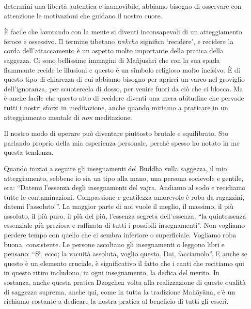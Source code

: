 
 determini una libertà autentica e inamovibile, abbiamo bisogno di osservare con attenzione le motivazioni che guidano il nostro cuore.

È facile che lavorando con la mente si diventi inconsapevoli di un atteggiamento feroce e ossessivo. Il termine tibetano \textit{trekcho} significa `recidere', e recidere la corda dell'attaccamento è un aspetto molto importante della pratica della saggezza. Ci sono bellissime immagini di Mañjushrī che con la sua spada fiammante recide le illusioni e questo è un simbolo religioso molto incisivo. È di questo tipo di chiarezza di cui abbiamo bisogno per aprirci un varco nel groviglio dell'ignoranza, per scuotercela di dosso, per venire fuori da ciò che ci blocca. Ma è anche facile che questo atto di recidere diventi una mera abitudine che pervade tutti i nostri sforzi in meditazione, anche quando miriamo a praticare in un atteggiamento mentale di \textit{non} meditazione. 

Il nostro modo di operare può diventare piuttosto brutale e squilibrato. Sto parlando proprio della mia esperienza personale, perché spesso ho notato in me questa tendenza.

Quando iniziai a seguire gli insegnamenti del Buddha sulla saggezza, il mio atteggiamento, sebbene io sia un tipo alla mano, una persona socievole e gentile, era: ``Datemi l'essenza degli insegnamenti del vajra. Andiamo al sodo e recidiamo tutte le contaminazioni. Compassione e gentilezza amorevole è roba da ragazzini, datemi l'assoluto!''. La maggior parte di noi vuole il meglio, il massimo, il più assoluto, il più puro, il più del più, l'essenza segreta dell'essenza, ``la quintessenza essenziale più preziosa e raffinata di tutti i possibili insegnamenti''. Non vogliamo perdere tempo con quello che ci sembra inferiore o superficiale. Vogliamo roba buona, consistente. Le persone ascoltano gli insegnamenti o leggono libri e pensano: ``Sì, ecco; la vacuità assoluta, voglio questo. Dai, facciamolo''. E anche se questo è un elemento cruciale, è significativo il fatto che i canti che recitiamo qui in questo ritiro includono, in ogni insegnamento, la dedica del merito. In sostanza, anche questa pratica Dzogchen volta alla realizzazione di queste qualità di saggezza suprema, anche qui, come in tutta la tradizione Mahāyāna, c'è un richiamo costante a dedicare la nostra pratica al beneficio di tutti gli esseri.

